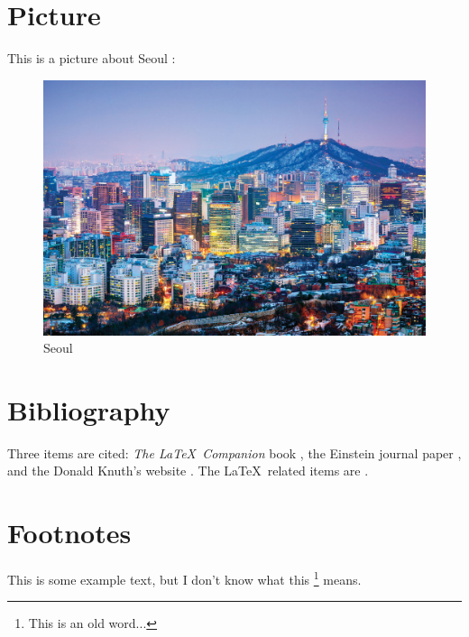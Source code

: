 \documentclass{article}
\begin{document}
\section{Picture}

This is a picture about Seoul :

\begin{figure}
  \includegraphics[width=\linewidth]{seoul.png}
  \caption{Seoul}
  \label{fig:seoul1}
\end{figure}

\section{Bibliography}
Three items are cited: \textit{The \LaTeX\ Companion} book \cite{latexcompanion}, the Einstein
journal paper \cite{einstein}, and the Donald Knuth's website \cite{knuthwebsite}. 
The \LaTeX\ related items are \cite{latexcompanion,knuthwebsite}. 
 
\medskip
 



\section{Footnotes}

This is some example text, but I don't know what this \footnote{\label{myfootnote}This is an old word...} means.
\end{document}
